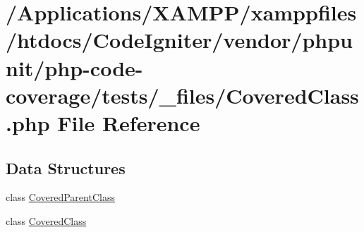 \hypertarget{php-code-coverage_2tests_2__files_2_covered_class_8php}{}\section{/\+Applications/\+X\+A\+M\+P\+P/xamppfiles/htdocs/\+Code\+Igniter/vendor/phpunit/php-\/code-\/coverage/tests/\+\_\+files/\+Covered\+Class.php File Reference}
\label{php-code-coverage_2tests_2__files_2_covered_class_8php}
\subsection*{Data Structures}
\begin{DoxyCompactItemize}
\item 
class \mbox{\hyperlink{class_covered_parent_class}{Covered\+Parent\+Class}}
\item 
class \mbox{\hyperlink{class_covered_class}{Covered\+Class}}
\end{DoxyCompactItemize}
